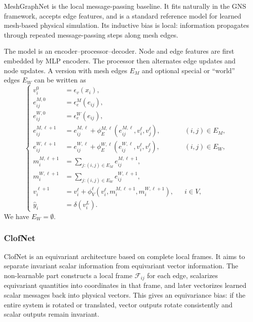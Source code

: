 \documentclass[11pt,a4paper,reqno]{amsart}
\theoremstyle{definition}
\theoremstyle{remark}
\numberwithin{equation}{section}
\begin{document}
MeshGraphNet is the local message-passing baseline. It fits naturally in the GNS framework, accepts edge features, and is a standard reference model for learned mesh-based physical simulation. Its inductive bias is local: information propagates through repeated message-passing steps along mesh edges. 

The model is an encoder--processor--decoder. Node and edge features are first embedded by MLP encoders. The processor then alternates edge updates and node updates. A version with mesh edges $E_M$ and optional special or ``world'' edges $E_W$ can be written as
\begin{equation}
\left\{
\begin{aligned}
    v_i^0 &= \epsilon_v(x_i), \\
    e_{ij}^{M,0}&=\epsilon_e^M(e_{ij}), \\
    e_{ij}^{W,0}&=\epsilon_e^W(e_{ij}),\\
    e_{ij}^{M,\ell+1}
    &= e_{ij}^{M,\ell}+\phi_E^{M,\ell}(e_{ij}^{M,\ell},v_i^\ell,v_j^\ell),
    && (i,j)\in E_M,\\
    e_{ij}^{W,\ell+1}
    &= e_{ij}^{W,\ell}+\phi_E^{W,\ell}(e_{ij}^{W,\ell},v_i^\ell,v_j^\ell),
    && (i,j)\in E_W,\\
    m_i^{M,\ell+1}&=\sum_{j:(i,j)\in E_M}e_{ij}^{M,\ell+1}, \\
    m_i^{W,\ell+1}&=\sum_{j:(i,j)\in E_W}e_{ij}^{W,\ell+1},\\
    v_i^{\ell+1}&=v_i^\ell+\phi_V^\ell(v_i^\ell,m_i^{M,\ell+1},m_i^{W,\ell+1}),
    && i\in V,\\
    \hat y_i&=\delta(v_i^L).
\end{aligned}
\right.
\label{eq:mgn}
\end{equation}
We have $E_W=\emptyset$. 

\subsubsection{ClofNet}

ClofNet is an equivariant architecture based on complete local frames. It aims to separate invariant scalar information from equivariant vector information. The non-learnable part constructs a local frame $\mathcal F_{ij}$ for each edge, scalarizes equivariant quantities into coordinates in that frame, and later vectorizes learned scalar messages back into physical vectors. This gives an equivariance bias: if the entire system is rotated or translated, vector outputs rotate consistently and scalar outputs remain invariant.
\end{document}
